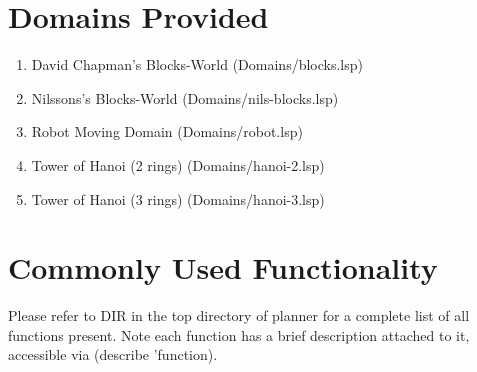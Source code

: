 \section{Domains Provided}

\begin{enumerate}
\item David Chapman's Blocks-World (Domains/blocks.lsp)
\item Nilssons's Blocks-World      (Domains/nils-blocks.lsp)
\item Robot Moving Domain          (Domains/robot.lsp)
\item Tower of Hanoi (2 rings)     (Domains/hanoi-2.lsp)
\item Tower of Hanoi (3 rings)     (Domains/hanoi-3.lsp)
\end{enumerate}

\section{Commonly Used Functionality}

Please refer to DIR in the top directory of planner for a complete
list of all functions present.  Note each function has a brief
description attached to it, accessible via (describe 'function).

